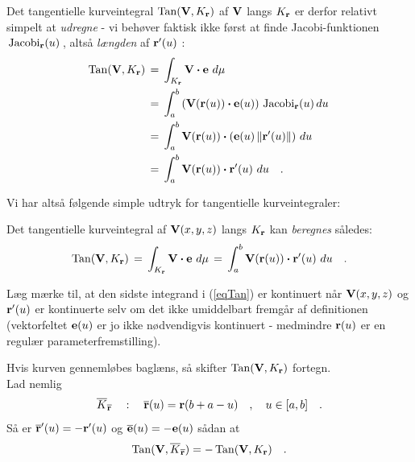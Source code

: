 Det {tangentielle kurveintegral} $\operatorname{Tan}({\bf V}, K_{\bf r})$ af ${\bf
V}$ langs $K_{\bf r}$ er derfor relativt simpelt at \emph{udregne} - vi
behøver faktisk ikke først at finde Jacobi-funktionen $\,\operatorname{Jacobi}_{\mathbf{r}}(u)\,$, altså
\emph{længden} af ${\bf r}'(u)$ :
\begin{equation} \label{eqTan}
\begin{aligned}
\operatorname{Tan}({\bf V}, K_{\bf r})\, &= \, \int_{K_{\bf r}}{\bf V}\bm{\cdot} {\bf e}\,\,d\mu \,\\
 &= \, \int_{a}^{b}\left({\bf
V}({\bf r}(u))\bm{\cdot} {\bf e}(u)\right) \, \operatorname{Jacobi}_{\mathbf{r}}(u) \,du \,\\
&= \, \int_{a}^{b}{\bf
V}({\bf r}(u))\bm{\cdot} \left({\bf e}(u)\,\Vert {\bf r}'(u) \Vert \right) \,du \,\\
 &=
\, \int_{a}^{b}{\bf V}({\bf r}(u))\bm{\cdot} {\bf r}'(u)\,\,du \quad .
\end{aligned}
\end{equation}

Vi har altså følgende simple udtryk for tangentielle kurveintegraler:

\begin{theorem}
Det tangentielle kurveintegral af ${\bf
V}(x,y,z)$ langs $K_{\bf r}$ kan \emph{beregnes} således:
\begin{equation}
\operatorname{Tan}({\bf V}, K_{\bf r})\, = \,  \int_{K_{\bf r}}{\bf V} \bm{\cdot} {\bf e}\,\,d\mu   \, = \, \int_{a}^{b}{\bf V}({\bf r}(u))\bm{\cdot} {\bf r}'(u)\,\,du \quad .
\end{equation}
\end{theorem}



\begin{aha}
Læg mærke til, at den sidste integrand i (\ref{eqTan}) er kontinuert når
${\bf V}(x,y,z)$ og ${\bf r}'(u)$ er kontinuerte selv om det ikke
umiddelbart fremgår af definitionen (vektorfeltet ${\bf e}(u)$ er jo
ikke nødvendigvis kontinuert - medmindre ${\bf r}(u)$ er en re\-gu\-lær
parameterfremstilling).
\end{aha}





\begin{think}
Hvis kurven gennemløbes baglæns, så skifter $\operatorname{Tan}({\bf V}, K_{\bf r})$ fortegn. \\

 Lad nemlig
\begin{equation}
\overline{K}_{\overline{\bf r}} \quad : \quad \overline{\bf r}(u) = \mathbf{r}(b+a-u) \quad , \quad u \in [a, b] \quad .
\end{equation}
Så er $\overline{{\bf r}}'(u) = - {\bf r}'(u)$ og $\overline{{\bf e}}(u) = - {\bf e}(u)$ sådan at
\begin{equation}
\operatorname{Tan}({\bf V}, \overline{K}_{\overline{\bf r}}) = -\operatorname{Tan}({\bf V}, K_{\bf r}) \quad .
\end{equation}
\end{think}

